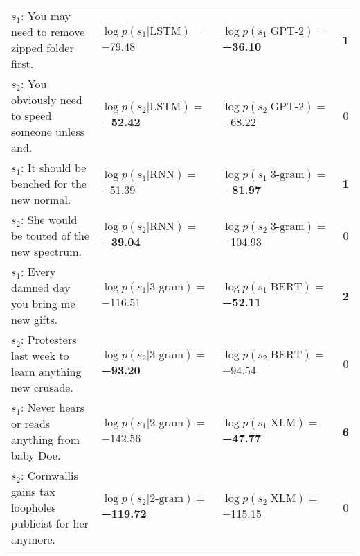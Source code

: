 \begin{tabularx}{\textwidth}{lllc}
               $s_1$: You may need to remove zipped folder first. &              $\log p(s_1 | \textrm{LSTM})=$\num{-79.48} &    $\log p(s_1 | \textrm{GPT-2})=$\textbf{\num{-36.10}} &  \textbf{\num{1}} \\
           $s_2$: You obviously need to speed someone unless and. &     $\log p(s_2 | \textrm{LSTM})=$\textbf{\num{-52.42}} &             $\log p(s_2 | \textrm{GPT-2})=$\num{-68.22} &           \num{0} \\\midrule
                  $s_1$: It should be benched for the new normal. &               $\log p(s_1 | \textrm{RNN})=$\num{-51.39} &   $\log p(s_1 | \textrm{3-gram})=$\textbf{\num{-81.97}} &  \textbf{\num{1}} \\
                  $s_2$: She would be touted of the new spectrum. &      $\log p(s_2 | \textrm{RNN})=$\textbf{\num{-39.04}} &           $\log p(s_2 | \textrm{3-gram})=$\num{-104.93} &           \num{0} \\\midrule
                  $s_1$: Every damned day you bring me new gifts. &           $\log p(s_1 | \textrm{3-gram})=$\num{-116.51} &     $\log p(s_1 | \textrm{BERT})=$\textbf{\num{-52.11}} &  \textbf{\num{2}} \\
       $s_2$: Protesters last week to learn anything new crusade. &   $\log p(s_2 | \textrm{3-gram})=$\textbf{\num{-93.20}} &              $\log p(s_2 | \textrm{BERT})=$\num{-94.54} &           \num{0} \\\midrule
              $s_1$: Never hears or reads anything from baby Doe. &           $\log p(s_1 | \textrm{2-gram})=$\num{-142.56} &      $\log p(s_1 | \textrm{XLM})=$\textbf{\num{-47.77}} &  \textbf{\num{6}} \\
 $s_2$: Cornwallis gains tax loopholes publicist for her anymore. &  $\log p(s_2 | \textrm{2-gram})=$\textbf{\num{-119.72}} &              $\log p(s_2 | \textrm{XLM})=$\num{-115.15} &           \num{0} \\
\bottomrule
\end{tabularx}
